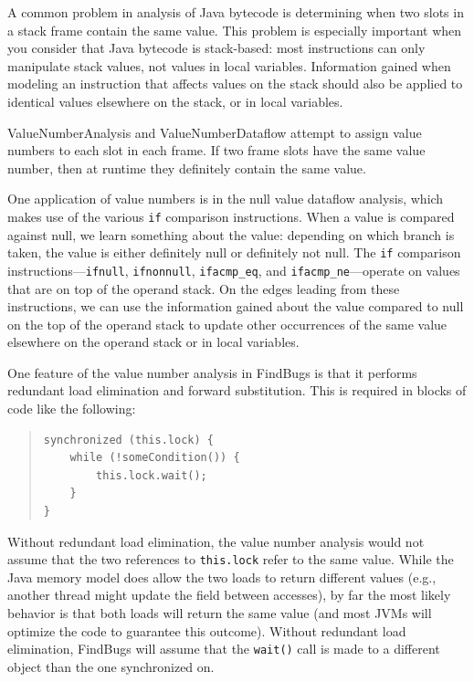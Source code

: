\documentclass[11pt]{article}
\begin{document}
A common problem in analysis of Java bytecode is determining when
two slots in a stack frame contain the same value.  This problem is
especially important when you consider that Java bytecode is stack-based:
most instructions can only manipulate stack values, not values in
local variables.  Information gained when modeling an instruction
that affects values on the stack should also be applied to identical
values elsewhere on the stack, or in local variables.

ValueNumberAnalysis and ValueNumberDataflow attempt to assign value numbers
to each slot in each frame.  If two frame slots have the same value number,
then at runtime they definitely contain the same value.

One application of value numbers is in the null value dataflow analysis,
which makes use of the various {\tt if} comparison instructions.
When a value is compared against null, we learn something about
the value: depending on which branch is taken, the value is either definitely
null or definitely not null.  The {\tt if} comparison instructions---{\tt ifnull},
{\tt ifnonnull}, {\tt ifacmp\_eq}, and {\tt ifacmp\_ne}---operate on
values that are on top of the operand stack.  On the edges leading from
these instructions, we can use the information gained about the value
compared to null on the top of the operand stack to update other occurrences of
the same value elsewhere on the operand stack or in local variables.

One feature of the value number analysis in FindBugs is that it
performs redundant load elimination and forward substitution.
This is required in blocks of code like the following:
\begin{quote}
\begin{verbatim}
synchronized (this.lock) {
    while (!someCondition()) {
        this.lock.wait();
    }
}
\end{verbatim}
\end{quote}
%
Without redundant load elimination, the value number analysis would not
assume that the two references to {\tt this.lock} refer to the same value.
While the Java memory model does allow the two loads to return
different values (e.g., another thread might update the field between
accesses), by far the most likely behavior is that both loads will
return the same value (and most JVMs will optimize the code to
guarantee this outcome).  Without redundant load elimination, FindBugs
will assume that the {\tt wait()} call is made to a different object
than the one synchronized on.
\end{document}
